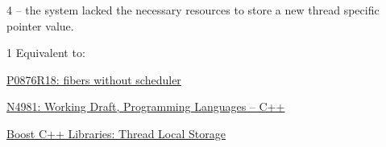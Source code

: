 \documentclass[fontsize=10pt,paper=A4,pagesize,DIV=15]{scrartcl}
\begin{document}
4 \errors
{} -- the system lacked the necessary
resources to store a new thread specific pointer value.


1 \effects
Equivalent to: 

\cbend






\newpage
{}
\begin{thebibliography}{99}

        \href{https://www.open-std.org/jtc1/sc22/wg21/docs/papers/2024/p0876r18.pdf}
        {P0876R18: fibers without scheduler}

        \href{https://www.open-std.org/jtc1/sc22/wg21/docs/papers/2024/n4981.pdf}
        {N4981: Working Draft, Programming Languages -- C++}

        \href{https://www.boost.org/doc/libs/release/doc/html/thread/thread_local_storage.html}
        {Boost C++ Libraries: Thread Local Storage}

\end{thebibliography}

\end{document}
